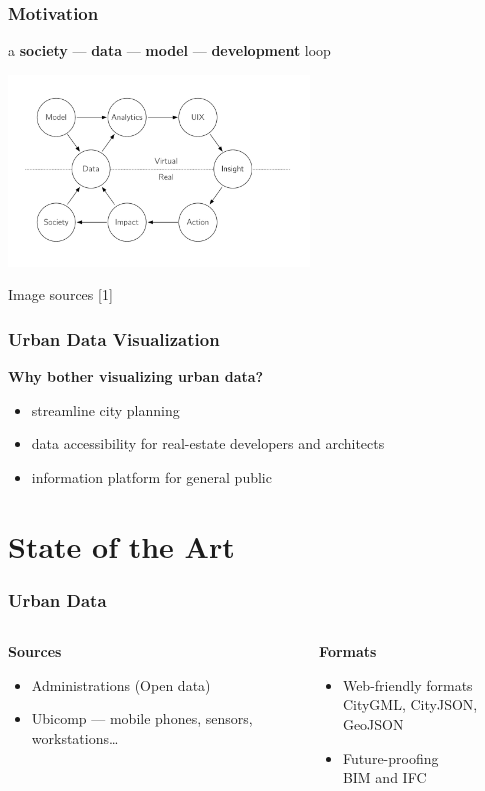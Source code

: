 \documentclass[czech,xcolor={table}]{beamer}
\begin{document}
	\begin{frame}
		\frametitle{Motivation}
		{
			\begin{center}
			a \textbf{society} --- \textbf{data} --- \textbf{model} --- \textbf{development} loop
			\end{center}
		}
		\begin{center}
			\includegraphics[width=0.6\textwidth]{imgs/Loop2.pdf}
		\end{center}
		\vspace{1em}
		\tiny Image sources [1]
	\end{frame}

	\begin{frame}
		\frametitle{Urban Data Visualization}
		\textbf{Why bother visualizing urban data?}
		\begin{itemize}
			\item streamline city planning
			\item data accessibility for real-estate developers and architects
			\item information platform for general public 
		\end{itemize}
	\end{frame}


	\section{State of the Art}
	\begin{frame}
		\frametitle{Urban Data}
		\begin{columns}[t]
			\begin{column}{0.5\textwidth}
				\textbf{Sources}
				\begin{itemize}
					\item Administrations (Open data)
					\item Ubicomp --- mobile phones, sensors, workstations\ldots
				\end{itemize}
			\end{column}
			\begin{column}{0.45\textwidth}
				\textbf{Formats}
				\begin{itemize}
					\item Web-friendly formats\\ 
					CityGML, CityJSON, GeoJSON
					\item Future-proofing\\ 
					BIM and IFC
				\end{itemize}
			\end{column}
		\end{columns}
	\end{frame}
\end{document}
